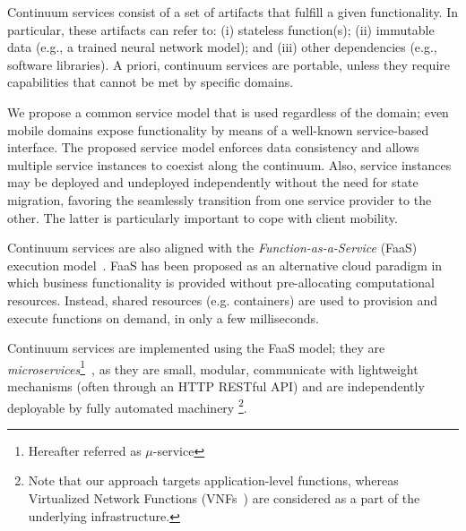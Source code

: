 Continuum services consist of a set of artifacts that fulfill a given functionality. In particular, these artifacts can refer to: (i) stateless function(s); (ii) immutable data (e.g., a trained neural network model); and (iii) other dependencies (e.g., software libraries). A priori, continuum services are portable, unless they require capabilities that cannot be met by specific domains. 

We propose a common service model that is used regardless of the domain; even mobile domains expose functionality by means of a well-known service-based interface. The proposed service model enforces data consistency and allows multiple service instances to coexist along the continuum. Also, service instances may be deployed and undeployed independently without the need for state migration, favoring the seamlessly transition from one service provider to the other. The latter is particularly important to cope with client mobility. 

Continuum services are also aligned with the \textit{Function-as-a-Service} (FaaS) execution model~\cite{MateosFaaster17}. FaaS has been proposed as an alternative cloud paradigm in which business functionality is provided without pre-allocating computational resources. Instead, shared resources (e.g. containers) are used to provision and execute functions on demand, in only a few milliseconds. 

Continuum services are implemented using the FaaS model; they are \textit{microservices}\footnote{Hereafter referred as $\mu$-service}~\cite{lewis2014microservices}, as they are small, modular, communicate with lightweight mechanisms (often through an HTTP RESTful API) and are independently deployable by fully automated machinery \footnote{Note that our approach targets application-level functions, whereas Virtualized Network Functions (VNFs~\cite{etsimec16}) are considered as a part of the underlying infrastructure.}.





